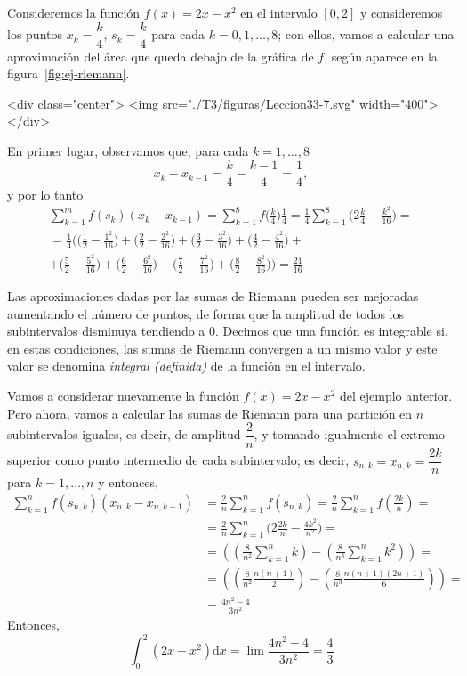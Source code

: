 \begin{ejemplo}\label{ej-riemann}
%
Consideremos la función $f(x)=2x-x^2$ en el intervalo $[0,2]$ y
consideremos los puntos $x_k=\dfrac{k}4$, $s_k=\dfrac{k}4$ para cada $k=0,1,\dots,8$;
con ellos, vamos a calcular una aproximación del área que queda debajo de la gráfica de $f$, según aparece en la figura~\ref{fig:ej-riemann}.
\begin{rawhtml}
<div class="center">
<img src="./T3/figuras/Leccion33-7.svg" width="400">
</div>
\end{rawhtml}
En primer lugar, observamos que, para cada $k=1,\dots,8$
\enlargethispage{-1.2ex}
\[
x_k-x_{k-1} = \frac{k}4 - \frac{k-1}4 = \frac14,
\]
y por lo tanto
\begin{multline*}
\sum_{k=1}^m f(s_k)(x_k-x_{k-1})
= \sum_{k=1}^8 f\big(\frac{k}4\big)\frac14
= \frac14\sum_{k=1}^8 \big(2\frac{k}4-\frac{k^2}{16}\big)=\\
= \frac14\big(\big(\frac{1}2-\frac{1^2}{16}\big) +
 \big(\frac{2}2-\frac{2^2}{16}\big) +
 \big(\frac{3}2-\frac{3^2}{16}\big) +
 \big(\frac{4}2-\frac{4^2}{16}\big) +\\
 +\big(\frac{5}2-\frac{5^2}{16}\big) +
 \big(\frac{6}2-\frac{6^2}{16}\big) +
 \big(\frac{7}2-\frac{7^2}{16}\big) +
 \big(\frac{8}2-\frac{8^2}{16}\big)\big) =\frac{21}{16}\tag*{\fej}
\end{multline*}
\end{ejemplo}

Las aproximaciones dadas por las sumas de Riemann pueden ser mejoradas aumentando el número de puntos, de forma que la amplitud de todos los subintervalos disminuya tendiendo a 0.
Decimos que una función es integrable si, en estas condiciones, las sumas de Riemann convergen a un mismo valor y este valor se denomina \emph{integral (definida)} de la función en el intervalo.

\begin{ejemplo}\label{ej-parab}
Vamos a considerar nuevamente la función $f(x)=2x-x^2$ del ejemplo anterior.
Pero ahora, vamos a calcular las sumas de Riemann para una partición en $n$ subintervalos iguales, es decir, de amplitud $\dfrac2n$, y tomando igualmente el extremo superior como punto intermedio de cada subintervalo;
es decir, $s_{n,k}=x_{n,k} = \dfrac{2k}n$ para $k=1,\dots,n$ y entonces,
\begin{align*}
\sum_{k=1}^n f(s_{n,k})(x_{n,k}-x_{n,k-1})
& = \frac2n\sum_{k=1}^n f(s_{n,k}) = \frac2n\sum_{k=1}^n f(\frac{2k}n)=\\
& = \frac2n \sum_{k=1}^n \big(2\frac{2k}n-\frac{4k^2}{n^2}\big)= \\
& = \left(\left( \frac8{n^2}\sum_{k=1}^n k\right) -\left( \frac8{n^3}\sum_{k=1}^n k^2\right)\right)=\\
& = \left(\left( \frac8{n^2}\frac{n(n+1)}2\right) -\left( \frac8{n^3}\frac{n(n+1)(2n+1)}6\right)
\right)=\\
& =\frac{4n^2-4}{3n^2}
\end{align*}
Entonces,
\[
\int_0^2(2x-x^2)\mathrm dx = \lim \frac{4n^2-4}{3n^2} =\frac43\tag*{\fej}
\]
\end{ejemplo}

